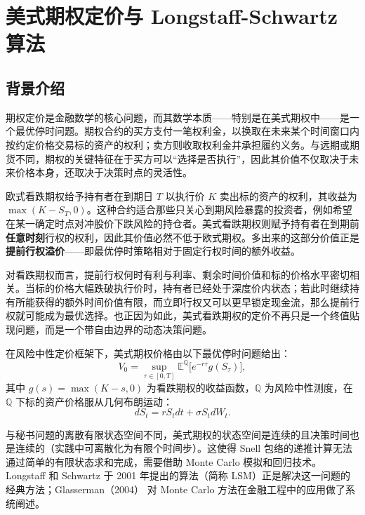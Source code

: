 \section{美式期权定价与 Longstaff-Schwartz 算法}

\subsection{背景介绍}

期权定价是金融数学的核心问题，而其数学本质——特别是在美式期权中——是一个最优停时问题。期权合约的买方支付一笔权利金，以换取在未来某个时间窗口内按约定价格交易标的资产的权利；卖方则收取权利金并承担履约义务。与远期或期货不同，期权的关键特征在于买方可以“选择是否执行”，因此其价值不仅取决于未来价格本身，还取决于决策时点的灵活性。

欧式看跌期权给予持有者在到期日 $T$ 以执行价 $K$ 卖出标的资产的权利，其收益为 $\max(K - S_T, 0)$。这种合约适合那些只关心到期风险暴露的投资者，例如希望在某一确定时点对冲股价下跌风险的持仓者。美式看跌期权则赋予持有者在到期前\textbf{任意时刻}行权的权利，因此其价值必然不低于欧式期权。多出来的这部分价值正是\textbf{提前行权溢价}——即最优停时策略相对于固定行权时间的额外收益。

对看跌期权而言，提前行权何时有利与利率、剩余时间价值和标的价格水平密切相关。当标的价格大幅跌破执行价时，持有者已经处于深度价内状态；若此时继续持有所能获得的额外时间价值有限，而立即行权又可以更早锁定现金流，那么提前行权就可能成为最优选择。也正因为如此，美式看跌期权的定价不再只是一个终值贴现问题，而是一个带自由边界的动态决策问题。

在风险中性定价框架下\cite{harrison1981martingales}，美式期权价格由以下最优停时问题给出\cite{longstaff2001valuing}：
\begin{equation}\label{eq:am_option}
  V_0 = \sup_{\tau \in [0, T]} \mathbb{E}^{\mathbb{Q}}\big[e^{-r\tau} g(S_\tau)\big],
\end{equation}
其中 $g(s) = \max(K - s, 0)$ 为看跌期权的收益函数，$\mathbb{Q}$ 为风险中性测度，在 $\mathbb{Q}$ 下标的资产价格服从几何布朗运动：
\begin{equation}\label{eq:gbm}
  dS_t = r S_t dt + \sigma S_t dW_t.
\end{equation}

与秘书问题的离散有限状态空间不同，美式期权的状态空间是连续的且决策时间也是连续的（实践中可离散化为有限个时间步）。这使得 Snell 包络的递推计算无法通过简单的有限状态求和完成，需要借助 Monte Carlo 模拟和回归技术。Longstaff 和 Schwartz 于 2001 年提出的算法\cite{longstaff2001valuing}（简称 LSM）正是解决这一问题的经典方法；Glasserman（2004）\cite{glasserman2004monte} 对 Monte Carlo 方法在金融工程中的应用做了系统阐述。

